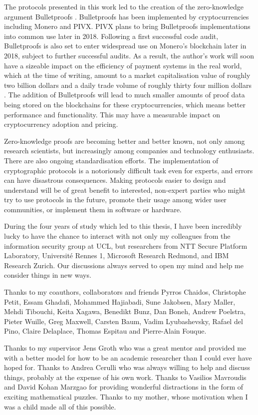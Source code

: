 The protocols presented in this work led to the creation of the zero-knowledge argument Bulletproofs \cite{BunzBBPWM18}. Bulletproofs has been implemented by cryptocurrencies including Monero and PIVX. PIVX plans to bring Bulletproofs implementations into common use later in 2018. Following a first successful code audit, Bulletproofs is also set to enter widespread use on Monero's blockchain later in 2018, subject to further successful audits. As a result, the author's work will soon have a sizeable impact on the efficiency of payment systems in the real world, which at the time of writing, amount to a market capitalisation value of roughly two billion dollars and a daily trade volume of roughly thirty four million dollars \footnotemark[1]. The addition of Bulletproofs will lead to much smaller amounts of proof data being stored on the blockchains for these cryptocurrencies, which means better performance and functionality. This may have a measurable impact on cryptocurrency adoption and pricing.

Zero-knowledge proofs are becoming better and better known, not only among research scientists, but increasingly among companies and technology enthusiasts. There are also ongoing standardisation efforts. The implementation of cryptographic protocols is a notoriously difficult task even for experts, and errors can have disastrous consequences. Making protocols easier to design and understand will be of great benefit to interested, non-expert parties who might try to use protocols in the future, promote their usage among wider user communities, or implement them in software or hardware.


\begin{acknowledgements}
During the four years of study which led to this thesis, I have been incredibly lucky to have the chance to interact with not only my colleagues from the information security group at UCL, but researchers from NTT Secure Platform Laboratory, Universit\'{e} Rennes 1, Microsoft Research Redmond, and IBM Research Zurich. Our discussions always served to open my mind and help me consider things in new ways.

Thanks to my coauthors, collaborators and friends Pyrros Chaidos, Christophe Petit, Essam Ghadafi, Mohammed Hajiabadi, Sune Jakobsen, Mary Maller, Mehdi Tibouchi, Keita Xagawa, Benedikt Bunz, Dan Boneh, Andrew Poelstra, Pieter Wuille, Greg Maxwell, Carsten Baum, Vadim Lyubashevsky, Rafael del Pino, Claire Delaplace, Thomas Espitau and Pierre-Alain Fouque.

Thanks to my supervisor Jens Groth who was a great mentor and provided me with a better model for how to be an academic researcher than I could ever have hoped for. Thanks to Andrea Cerulli who was always willing to help and discuss things, probably at the expense of his own work. Thanks to Vasilios Mavroudis and David Kohan Marzgao for providing wonderful distractions in the form of exciting mathematical puzzles. Thanks to my mother, whose motivation when I was a child made all of this possible.
\end{acknowledgements}

\setcounter{tocdepth}{2} 

\tableofcontents
\listoffigures
\listoftables


